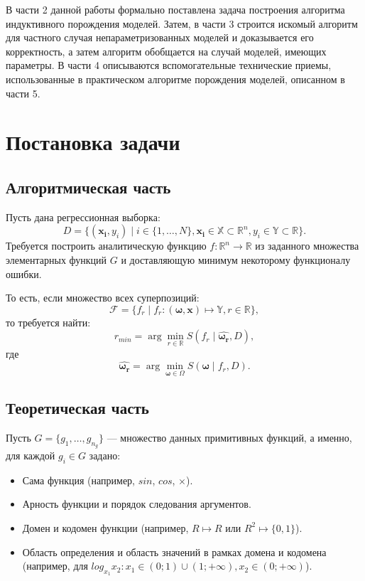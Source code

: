 \documentclass[12pt,a4paper]{amsart}
\begin{document}
В части 2 данной работы формально поставлена задача построения алгоритма
индуктивного порождения моделей. Затем, в части 3 строится искомый алгоритм
для частного случая непараметризованных моделей и доказывается его корректность,
а затем алгоритм обобщается на случай моделей, имеющих параметры. В части 4
описываются вспомогательные технические приемы, использованные в практическом
алгоритме порождения моделей, описанном в части 5.

\section{Постановка задачи}

\subsection{Алгоритмическая часть}

Пусть дана регрессионная выборка:
\[
D = \{ (\mathbf{x_i}, y_i) \mid i \in \{1, \dots, N\},
			\mathbf{x_i} \in \mathbb{X} \subset \mathbb{R}^n,
			y_i \in \mathbb{Y} \subset \mathbb{R} \}.
\]
Требуется построить аналитическую функцию $f : \mathbb{R}^n \rightarrow \mathbb{R}$ из
заданного множества элементарных функций $G$ и доставляющую минимум
некоторому функционалу ошибки.

То есть, если множество всех суперпозиций:
\[
\mathcal{F} = \{ f_r \mid
			f_r : (\boldsymbol{\omega}, \mathbf{x}) \mapsto \mathbb{Y},
			r \in \mathbb{R} \},
\]
то требуется найти:
\[
r_{min} = \arg \min_{r \in \mathbb{R}} S (f_r \mid \boldsymbol{\hat{\omega_r}}, D),
\]
где
\[
\boldsymbol{\hat{\omega_r}} = \arg \min_{\boldsymbol{\omega} \in \Omega} S(\boldsymbol{\omega} \mid f_r, D).
\]

\subsection{Теоретическая часть}

Пусть $G = \{ g_1, \dots, g_{n_g} \}$ --- множество данных примитивных
функций, а именно, для каждой $g_i \in G$ задано:

\begin{itemize}
  \item Сама функция (например, $sin$, $cos$, $\times$).
  \item Арность функции и порядок следования аргументов.
  \item Домен и кодомен функции (например, $R \mapsto R$ или $R^2 \mapsto \{0, 1\}$).
  \item Область определения и область значений в рамках домена и кодомена (например,
	для $log_{x_1} x_2 : x_1 \in (0; 1) \cup (1; +\infty), x_2 \in (0; +\infty)$).
\end{itemize}
\end{document}
